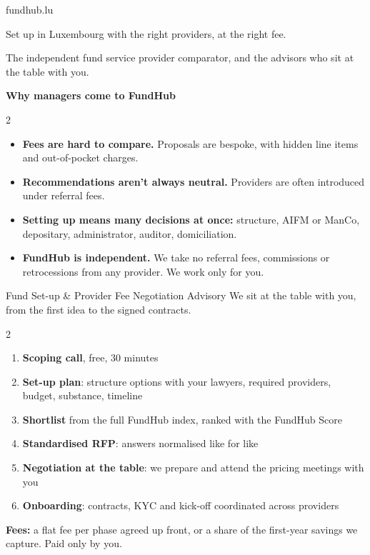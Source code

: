 \documentclass[10pt,a4paper]{article}
\begin{document}
\begin{fhdark}
  {\fontsize{28}{32}\selectfont\fundhublight}\hfill{\small\textcolor{fhEmerald}{fundhub.lu}}\par\vspace{4pt}
  {\Large Set up in Luxembourg with the right providers, at the right fee.}\par\vspace{4pt}
  {\small\textcolor{fhLine}{The independent fund service provider comparator, and the advisors who sit at the table with you.}}
\end{fhdark}

\vspace{6pt}
{\large\bfseries Why managers come to FundHub}

\begin{multicols}{2}
\begin{itemize}
  \item \textbf{Fees are hard to compare.} Proposals are bespoke, with hidden line items and out-of-pocket charges.
  \item \textbf{Recommendations aren't always neutral.} Providers are often introduced under referral fees.
  \item \textbf{Setting up means many decisions at once:} structure, AIFM or ManCo, depositary, administrator, auditor, domiciliation.
  \item \textbf{FundHub is independent.} We take no referral fees, commissions or retrocessions from any provider. We work only for you.
\end{itemize}
\end{multicols}

\begin{fhpanel}{Fund Set-up \& Provider Fee Negotiation Advisory}
  We sit at the table with you, from the first idea to the signed contracts.
  \begin{multicols}{2}
  \begin{enumerate}[label=\textcolor{fhEmeraldDark}{\bfseries\arabic*.}, leftmargin=1.4em]
    \item \textbf{Scoping call}, free, 30 minutes
    \item \textbf{Set-up plan}: structure options with your lawyers, required providers, budget, substance, timeline
    \item \textbf{Shortlist} from the full FundHub index, ranked with the FundHub Score
    \item \textbf{Standardised RFP}: answers normalised like for like
    \item \textbf{Negotiation at the table}: we prepare and attend the pricing meetings with you
    \item \textbf{Onboarding}: contracts, KYC and kick-off coordinated across providers
  \end{enumerate}
  \end{multicols}
  \textbf{Fees:} a flat fee per phase agreed up front, or a share of the first-year savings we capture. Paid only by you.
\end{fhpanel}
\end{document}
